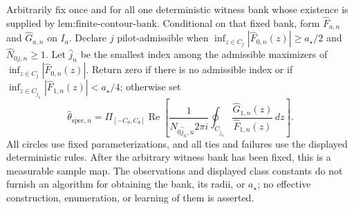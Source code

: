 Arbitrarily fix once and for all one deterministic witness bank whose existence is supplied by \(\text{lem:finite-contour-bank}\).  Conditional on that fixed bank, form \(\widehat F_{a,n}\) and \(\widehat G_{a,n}\) on \(I_a\).  Declare \(j\) pilot-admissible when \(\inf_{z\in C_j}|\widehat F_{0,n}(z)|\ge a_{\star}/2\) and \(\widehat N_{0j,n}\ge1\).  Let \(\widehat j_n\) be the smallest index among the admissible maximizers of \(\inf_{z\in C_j}|\widehat F_{0,n}(z)|\).  Return zero if there is no admissible index or if \(\inf_{z\in C_{\widehat j_n}}|\widehat F_{1,n}(z)|<a_{\star}/4\); otherwise set
\[
 \widehat\theta_{\mathrm{spec},n}
 =\Pi_{[-C_{\theta},C_{\theta}]}
 \operatorname{Re}\!\left[
 \frac{1}{\widehat N_{0\widehat j_n,n}2\pi i}
 \oint_{C_{\widehat j_n}}
 \frac{\widehat G_{1,n}(z)}{\widehat F_{1,n}(z)}\,dz
 \right].
\]
All circles use fixed parameterizations, and all ties and failures use the displayed deterministic rules.  After the arbitrary witness bank has been fixed, this is a measurable sample map.  The observations and displayed class constants do not furnish an algorithm for obtaining the bank, its radii, or \(a_{\star}\); no effective construction, enumeration, or learning of them is asserted.